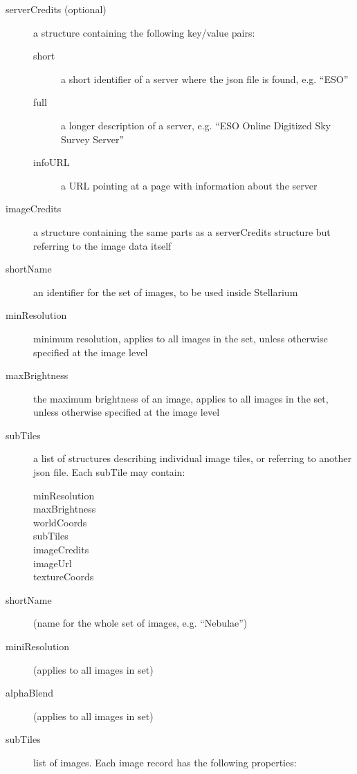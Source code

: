 \begin{description}
\item[serverCredits (optional)] a structure containing the following
  key/value pairs:

  \begin{description}
  \item[short] a short identifier of a server where the json file is found, e.g. ``ESO''
  \item[full]  a longer description of a server, e.g. ``ESO Online Digitized Sky Survey Server''
  \item[infoURL] a URL pointing at a page with information about the server
  \end{description}
\item[imageCredits] a structure containing the same parts as a
  serverCredits structure but referring to the image data itself
\item[shortName] an identifier for the set of images, to be used inside Stellarium
\item[minResolution] minimum resolution, applies to all images in the set,
  unless otherwise specified at the image level
\item[maxBrightness] the maximum brightness of an image, applies to all
  images in the set, unless otherwise specified at the image level
\item[subTiles] a list of structures describing individual image tiles, or
  referring to another json file. Each subTile may contain:

  \begin{description}
  \item[minResolution]
  \item[maxBrightness]
  \item[worldCoords]
  \item[subTiles]
  \item[imageCredits]
  \item[imageUrl]
  \item[textureCoords]
  \end{description}
\item[shortName] (name for the whole set of images, e.g. ``Nebulae'')
\item[miniResolution] (applies to all images in set)
\item[alphaBlend] (applies to all images in set)
\item[subTiles] list of images. Each image record has the following properties:


\end{description}
